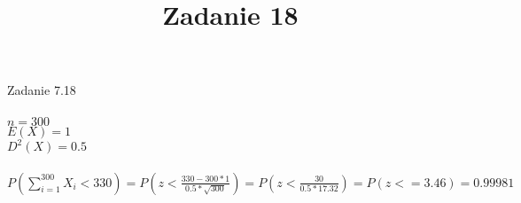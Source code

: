 \documentclass[11pt,a4paper]{article}
\title{Zadanie 18}
\begin{document}
	Zadanie 7.18
\\\\
$n = 300$\\
$ E(X) = 1$\\
$D^2(X) = 0.5$\\\\
$P(\sum\limits_{i=1}^{300}  X_{i} < 330 ) = P(z < \frac{330 - 300 * 1}{0.5 * \sqrt{300}}) = P(z < \frac{30}{0.5 * 17.32}) = P(z <= 3.46) = 0.99981$
\end{document}
